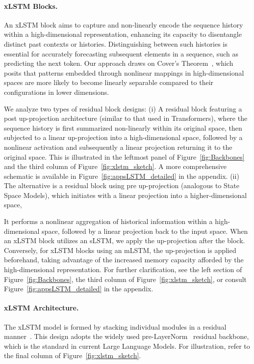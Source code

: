 \paragraph{xLSTM Blocks.}
\label{sec:xLSTMblock}
An xLSTM block aims to capture and non-linearly encode the sequence history within a high-dimensional representation, enhancing its capacity to disentangle distinct past contexts or histories. Distinguishing between such histories is essential for accurately forecasting subsequent elements in a sequence, such as predicting the next token. Our approach draws on Cover’s Theorem~\citep{Cover:65}, which posits that patterns embedded through nonlinear mappings in high-dimensional spaces are more likely to become linearly separable compared to their configurations in lower dimensions. 

We analyze two types of residual block designs: (i) A residual block featuring a post up-projection architecture (similar to that used in Transformers), where the sequence history is first summarized non-linearly within its original space, then subjected to a linear up-projection into a high-dimensional space, followed by a nonlinear activation and subsequently a linear projection returning it to the original space. This is illustrated in the leftmost panel of Figure~\ref{fig:Backbones} and the third column of Figure~\ref{fig:xlstm_sketch}. A more comprehensive schematic is available in Figure~\ref{fig:appsLSTM_detailed} in the appendix. (ii) The alternative is a residual block using pre up-projection (analogous to State Space Models), which initiates with a linear projection into a higher-dimensional space,

It performs a nonlinear aggregation of historical information within a high-dimensional space, followed by a linear projection back to the input space. When an xLSTM block utilizes an sLSTM, we apply the up-projection after the block. Conversely, for xLSTM blocks using an mLSTM, the up-projection is applied beforehand, taking advantage of the increased memory capacity afforded by the high-dimensional representation. For further clarification, see the left section of Figure~\ref{fig:Backbones}, the third column of Figure~\ref{fig:xlstm_sketch}, or consult Figure~\ref{fig:appsLSTM_detailed} in the appendix.

\paragraph{xLSTM Architecture. }
\label{sec:xLSTMarchitecure}
The xLSTM model is formed by stacking individual modules in a residual manner~\citep{Srivastava:15,He:16}. This design adopts the widely used pre-LayerNorm~\citep{Ba:16b} residual backbone, which is the standard in current Large Language Models. For illustration, refer to the final column of Figure~\ref{fig:xlstm_sketch}.

